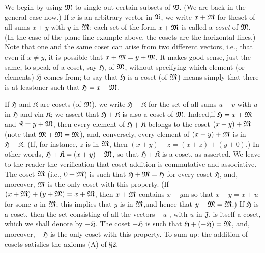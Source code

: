 We begin by using \(\mathfrak{M}\) to single out certain subsets of  \(\mathfrak{V}\). (We
are back in the general case now.) If \(x\) is an arbitrary vector in
\(\mathfrak{V}\), we write \(x + \mathfrak{M}\) for theset of all sums \(x+y\) with \(y\) in
\(\mathfrak{M}\); each set of the form \(x + \mathfrak{M}\) is called a \emph{coset} of
\(\mathfrak{M}\). (In the case of the plane-line example above, the cosets are the
horizontal lines.) Note that one and the same coset can arise from two different
vectors, i.e., that even if \(x \neq y\), it is possible that \(x + \mathfrak{M} = y +
\mathfrak{M}\). It makes good sense, just the same, to speak of a coset, say
\(\mathfrak{H}\), of \(\mathfrak{M}\), without specifying which element (or elements)
\(\mathfrak{H}\) comes from; to say that \(\mathfrak{H}\) is a coset (of \(\mathfrak{M}\))
means simply that there is at leastoner such that \(\mathfrak{H} = x + \mathfrak{M}\).

If \(\mathfrak{H}\) and \(\mathfrak{K}\) are cosets (of \(\mathfrak{M}\)), we write
\(\mathfrak{H} + \mathfrak{K}\) for the set of all sums \(u + v\) with \(u\) in
\(\mathfrak{H}\) and \(v\)in \(\mathfrak{K}\); we assert that \(\mathfrak{H} +
\mathfrak{K}\) is also a coset of \(\mathfrak{M}\). Indeed,if \(\mathfrak{H} = x +
\mathfrak{M}\) and \(\mathfrak{K} = y + \mathfrak{M}\), then every element of \(\mathfrak{H}
+ \mathfrak{K}\) belongs to the coset \((x + y) + \mathfrak{M}\) (note that \(\mathfrak{M} +
\mathfrak{M} = \mathfrak{M}\)), and, conversely, every element of \((x + y) + \mathfrak{M}\) is in
\(\mathfrak{H} + \mathfrak{K}\). (If, for instance, \(z\) is in \(\mathfrak{M}\), then
\((x + y) + z = (x + z) + (y + 0)\).) In other words, \(\mathfrak{H} +
\mathfrak{K} = (x+y) + \mathfrak{M}\), so that \(\mathfrak{H} + \mathfrak{K}\) is a
coset, as asserted. We leave to the reader the verification that coset addition
is commutative and associative. The coset \(\mathfrak{M}\) (i.e., \(0 + \mathfrak{M}\)) is
such that \(\mathfrak{H} + \mathfrak{M} = \mathfrak{H}\) for every coset
\(\mathfrak{H}\), and, moreover, \(\mathfrak{M}\) is the only coset with this
property. (If \((x + \mathfrak{M}) + (y + \mathfrak{M}) = x + \mathfrak{M}\), then \(x + \mathfrak{M}\)
contains \(x + y\)m so that \(x + y = x + u\) for some \(u\) in \(\mathfrak{M}\); this
implies that \(y\) is in \(\mathfrak{M}\),and hence that \(y + \mathfrak{M} = \mathfrak{M}\).) If
\(\mathfrak{H}\) is a coset, then the set consisting of all the vectors \(-u\) ,
with \(u\) in \(\mathfrak{J}\), is itself a coset, which we shall denote by
\(-\mathfrak{H}\). The coset \(-\mathfrak{H}\) is such that \(\mathfrak{H} + (-\mathfrak{H}) =
\mathfrak{M}\), and, moreover, \(-\mathfrak{H}\) is the only coset with this property. To
sum up: the addition of cosets satisfies the axioms (A) of §2.

